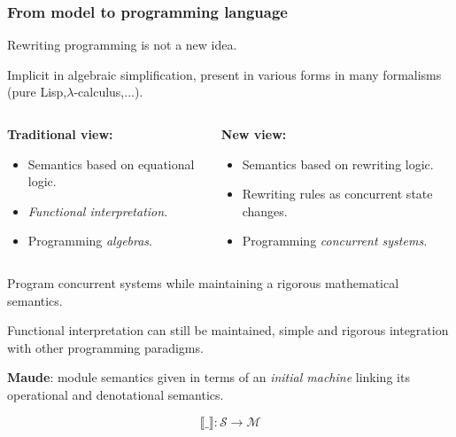 \documentclass{beamer}
\begin{document}
\begin{frame}
    \scriptsize
    \frametitle{From model to programming language}
    Rewriting programming is not a new idea.

    \bigskip
    Implicit in algebraic simplification, present in various forms in many formalisms (pure Lisp,$\lambda$-calculus,...).

    \bigskip
    \begin{columns}[t,onlytextwidth]
        \begin{column}{.5\textwidth}
            \textbf{Traditional view:}
            
            \begin{itemize}
                \item Semantics based on equational logic.
                \item \emph{Functional interpretation}.
                \item Programming \emph{algebras}.
            \end{itemize}
        \end{column}
        \begin{column}{.5\textwidth}
            \textbf{New view:}
            \begin{itemize}
                \item Semantics based on rewriting logic.
                \item Rewriting rules as concurrent state changes.
                \item Programming \emph{concurrent systems.}
            \end{itemize}
        \end{column}

        
    \end{columns}

    \bigskip
    Program concurrent systems while maintaining a rigorous mathematical semantics.
    
    \bigskip
    Functional interpretation can still be maintained, simple and rigorous integration with other programming paradigms.

    \bigskip
    \textbf{Maude}: module semantics given in terms of an \emph{initial machine} linking its operational and denotational semantics.

    $$ \llbracket \_ \rrbracket: \mathcal{S} \rightarrow \mathcal{M}$$
\end{frame}
\end{document}
